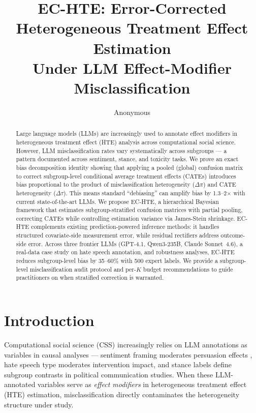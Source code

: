 \documentclass[11pt,a4paper]{article}
\title{EC-HTE: Error-Corrected Heterogeneous Treatment Effect Estimation\\Under LLM Effect-Modifier Misclassification}
\author{Anonymous}
\begin{document}
\maketitle

\begin{abstract}
Large language models (LLMs) are increasingly used to annotate effect modifiers in heterogeneous treatment effect (HTE) analysis across computational social science.
However, LLM misclassification rates vary systematically across subgroups --- a pattern documented across sentiment, stance, and toxicity tasks.
We prove an exact bias decomposition identity showing that applying a pooled (global) confusion matrix to correct subgroup-level conditional average treatment effects (CATEs) introduces bias proportional to the product of misclassification heterogeneity ($\Delta\pi$) and CATE heterogeneity ($\Delta\tau$).
This means standard ``debiasing'' can amplify bias by 1.3--2$\times$ with current state-of-the-art LLMs.
We propose EC-HTE, a hierarchical Bayesian framework that estimates subgroup-stratified confusion matrices with partial pooling, correcting CATEs while controlling estimation variance via James-Stein shrinkage.
EC-HTE complements existing prediction-powered inference methods: it handles structured covariate-side measurement error, while residual rectifiers address outcome-side error.
Across three frontier LLMs (GPT-4.1, Qwen3-235B, Claude Sonnet~4.6), a real-data case study on hate speech annotation, and robustness analyses, EC-HTE reduces subgroup-level bias by 35--60\% with 500 expert labels.
We provide a subgroup-level misclassification audit protocol and per-$K$ budget recommendations to guide practitioners on when stratified correction is warranted.
\end{abstract}

\section{Introduction}

Computational social science (CSS) increasingly relies on LLM annotations as variables in causal analyses --- sentiment framing moderates persuasion effects \citep{egami2024}, hate speech type moderates intervention impact, and stance labels define subgroup contrasts in political communication studies.
When these LLM-annotated variables serve as \emph{effect modifiers} in heterogeneous treatment effect (HTE) estimation, misclassification directly contaminates the heterogeneity structure under study.
\end{document}
